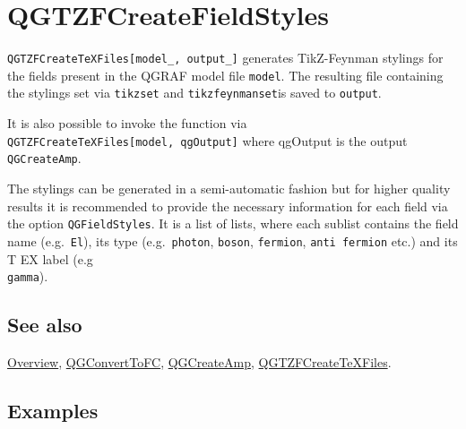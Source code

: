 \documentclass[../FeynHelpersManual.tex]{subfiles}
\begin{document}
\hypertarget{qgtzfcreatefieldstyles}{
\section{QGTZFCreateFieldStyles}\label{qgtzfcreatefieldstyles}}

\texttt{QGTZFCreateTeXFiles[\allowbreak{}model_,\ \allowbreak{}output_]}
generates TikZ-Feynman stylings for the fields present in the QGRAF
model file \texttt{model}. The resulting file containing the stylings
set via \texttt{tikzset} and \texttt{tikzfeynmanset}is saved to
\texttt{output}.

It is also possible to invoke the function via
\texttt{QGTZFCreateTeXFiles[\allowbreak{}model,\ \allowbreak{}qgOutput]}
where qgOutput is the output \texttt{QGCreateAmp}.

The stylings can be generated in a semi-automatic fashion but for higher
quality results it is recommended to provide the necessary information
for each field via the option \texttt{QGFieldStyles}. It is a list of
lists, where each sublist contains the field name (e.g.~\texttt{El}),
its type (e.g.~\texttt{photon}, \texttt{boson}, \texttt{fermion},
\texttt{anti fermion} etc.) and its T EX label (e.g \texttt{\\gamma}).

\subsection{See also}

\hyperlink{toc}{Overview}, \hyperlink{qgconverttofc}{QGConvertToFC},
\hyperlink{qgcreateamp}{QGCreateAmp},
\hyperlink{qgtzfcreatetexfiles}{QGTZFCreateTeXFiles}.

\subsection{Examples}
\end{document}
